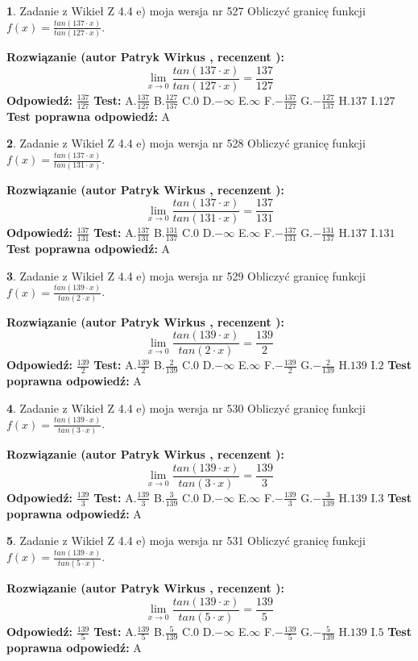 \documentclass[12pt, a4paper]{article}
\theoremstyle{definition} %
\newtheorem{zad}{}
\newcommand{\zadStart}[1]{\begin{zad}#1\newline}
\newcommand{\zadStop}{\end{zad}}
\newcommand{\rozwStart}[2]{\noindent \textbf{Rozwiązanie (autor #1 , recenzent #2): }\newline}
\newcommand{\rozwStop}{\newline}
\newcommand{\odpStart}{\noindent \textbf{Odpowiedź:}\newline}
\newcommand{\odpStop}{\newline}
\newcommand{\testStart}{\noindent \textbf{Test:}\newline}
\newcommand{\testStop}{\newline}
\newcommand{\kluczStart}{\noindent \textbf{Test poprawna odpowiedź:}\newline}
\newcommand{\kluczStop}{\newline}
\begin{document}
\zadStart{Zadanie z Wikieł Z 4.4 e) moja wersja nr 527}
Obliczyć granicę funkcji $f(x)=\frac{tan(137\cdot x)}{tan(127\cdot x)}$.
\zadStop
\rozwStart{Patryk Wirkus}{}
$$\lim\limits_{x\to 0}\frac{tan(137\cdot x)}{tan(127\cdot x)}=
\frac{137}{127}$$
\rozwStop
\odpStart
$\frac{137}{127}$
\odpStop
\testStart
A.$\frac{137}{127}$
B.$\frac{127}{137}$
C.$0$
D.$-\infty$
E.$\infty$
F.$-\frac{137}{127}$
G.$-\frac{127}{137}$
H.$137$
I.$127$
\testStop
\kluczStart
A
\kluczStop



\zadStart{Zadanie z Wikieł Z 4.4 e) moja wersja nr 528}
Obliczyć granicę funkcji $f(x)=\frac{tan(137\cdot x)}{tan(131\cdot x)}$.
\zadStop
\rozwStart{Patryk Wirkus}{}
$$\lim\limits_{x\to 0}\frac{tan(137\cdot x)}{tan(131\cdot x)}=
\frac{137}{131}$$
\rozwStop
\odpStart
$\frac{137}{131}$
\odpStop
\testStart
A.$\frac{137}{131}$
B.$\frac{131}{137}$
C.$0$
D.$-\infty$
E.$\infty$
F.$-\frac{137}{131}$
G.$-\frac{131}{137}$
H.$137$
I.$131$
\testStop
\kluczStart
A
\kluczStop



\zadStart{Zadanie z Wikieł Z 4.4 e) moja wersja nr 529}
Obliczyć granicę funkcji $f(x)=\frac{tan(139\cdot x)}{tan(2\cdot x)}$.
\zadStop
\rozwStart{Patryk Wirkus}{}
$$\lim\limits_{x\to 0}\frac{tan(139\cdot x)}{tan(2\cdot x)}=
\frac{139}{2}$$
\rozwStop
\odpStart
$\frac{139}{2}$
\odpStop
\testStart
A.$\frac{139}{2}$
B.$\frac{2}{139}$
C.$0$
D.$-\infty$
E.$\infty$
F.$-\frac{139}{2}$
G.$-\frac{2}{139}$
H.$139$
I.$2$
\testStop
\kluczStart
A
\kluczStop



\zadStart{Zadanie z Wikieł Z 4.4 e) moja wersja nr 530}
Obliczyć granicę funkcji $f(x)=\frac{tan(139\cdot x)}{tan(3\cdot x)}$.
\zadStop
\rozwStart{Patryk Wirkus}{}
$$\lim\limits_{x\to 0}\frac{tan(139\cdot x)}{tan(3\cdot x)}=
\frac{139}{3}$$
\rozwStop
\odpStart
$\frac{139}{3}$
\odpStop
\testStart
A.$\frac{139}{3}$
B.$\frac{3}{139}$
C.$0$
D.$-\infty$
E.$\infty$
F.$-\frac{139}{3}$
G.$-\frac{3}{139}$
H.$139$
I.$3$
\testStop
\kluczStart
A
\kluczStop



\zadStart{Zadanie z Wikieł Z 4.4 e) moja wersja nr 531}
Obliczyć granicę funkcji $f(x)=\frac{tan(139\cdot x)}{tan(5\cdot x)}$.
\zadStop
\rozwStart{Patryk Wirkus}{}
$$\lim\limits_{x\to 0}\frac{tan(139\cdot x)}{tan(5\cdot x)}=
\frac{139}{5}$$
\rozwStop
\odpStart
$\frac{139}{5}$
\odpStop
\testStart
A.$\frac{139}{5}$
B.$\frac{5}{139}$
C.$0$
D.$-\infty$
E.$\infty$
F.$-\frac{139}{5}$
G.$-\frac{5}{139}$
H.$139$
I.$5$
\testStop
\kluczStart
A
\kluczStop
\end{document}
